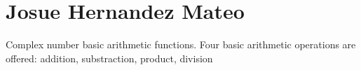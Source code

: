 \section*{Josue Hernandez Mateo}

Complex number basic arithmetic functions. Four basic arithmetic operations are offered\+: addition, substraction, product, division 